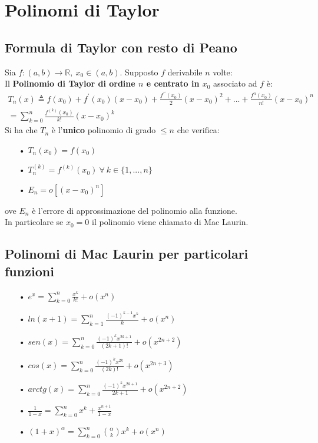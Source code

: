 \chapter{Polinomi di Taylor}
\section{Formula di Taylor con resto di Peano}
Sia $f: (a,b) \to \mathbb{R},\ x_0 \in (a,b)$. Supposto $f$ derivabile $n$ volte:\\
Il \textbf{Polinomio di Taylor di ordine $n$ e centrato in $x_0$} associato ad $f$ è:
\begin{equation}
\begin{split}
T_n(x) \triangleq f(x_0) + f^{\prime}(x_0)(x - x_0) + \frac{f^{\prime\prime}(x_0)}{2}(x - x_0)^2 +...+\frac{f^{n}(x_0)}{n!}(x - x_0)^n\\
\displaystyle = \sum_{k=0}^n \frac{f^{(k)}(x_0)}{k!}(x - x_0)^k
\end{split}
\end{equation}
Si ha che $T_n$ è l'\textbf{unico} polinomio di grado $\leq n$ che verifica:
\begin{enumerate}
\item[•] $T_n(x_0) = f(x_0)$
\item[•] $T_n^{(k)} = f^{(k)}(x_0)\ \forall\ k \in \{1,...,n\}$
\item[•] $E_n = o[(x -x_0)^n]$
\end{enumerate}
ove $E_n$ è l'errore di approssimazione del polinomio alla funzione.\\
In particolare se $x_0 = 0$ il polinomio viene chiamato di Mac Laurin.

\section{Polinomi di Mac Laurin per particolari funzioni}
\begin{enumerate}
\item[•] $\displaystyle e^x = \sum_{k=0}^n\frac{x^k}{k!} + o(x^n)$
\item[•] $\displaystyle ln(x + 1) = \sum_{k=1}^n\frac{(-1)^{k-1}x^k}{k} + o(x^n)$
\item[•] $\displaystyle sen(x) = \sum_{k=0}^n\frac{(-1)^{k}x^{2k + 1}}{(2k+1)!} + o(x^{2n + 2})$
\item[•] $\displaystyle cos(x) = \sum_{k=0}^n\frac{(-1)^{k}x^{2k}}{(2k)!} + o(x^{2n + 3})$
\item[•] $\displaystyle arctg(x) = \sum_{k=0}^n\frac{(-1)^{k}x^{2k + 1}}{2k+1} + o(x^{2n + 2})$
\item[•] $\displaystyle \frac{1}{1 - x} = \sum_{k=0}^nx^k + \frac{x^{n+1}}{1 - x}$
\item[•] $\displaystyle (1 + x)^\alpha = \sum_{k = 0}^n {\alpha \choose k}x^k + o(x^n)$
\end{enumerate}
